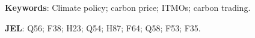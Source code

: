 \documentclass[12pt,english]{article}
\begin{document}
\begin{abstract}


\end{abstract}

\textbf{Keywords}: Climate policy; carbon price; ITMOs; carbon trading.%

\textbf{JEL}: Q56; F38; H23; Q54; H87; F64; Q58; F53; F35.
\end{document}
